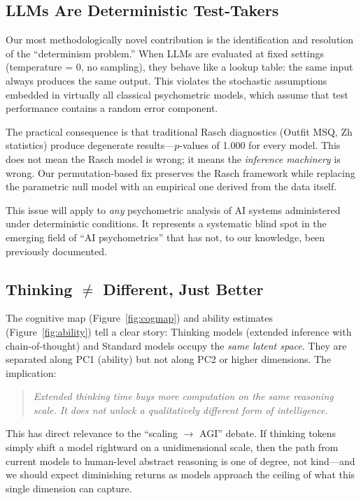 \documentclass[11pt, letterpaper]{article}
\begin{document}
\subsection{LLMs Are Deterministic Test-Takers}

Our most methodologically novel contribution is the identification and resolution of the ``determinism problem.'' When LLMs are evaluated at fixed settings (temperature = 0, no sampling), they behave like a lookup table: the same input always produces the same output. This violates the stochastic assumptions embedded in virtually all classical psychometric models, which assume that test performance contains a random error component.

The practical consequence is that traditional Rasch diagnostics (Outfit MSQ, Zh statistics) produce degenerate results---$p$-values of 1.000 for every model. This does not mean the Rasch model is wrong; it means the \textit{inference machinery} is wrong. Our permutation-based fix preserves the Rasch framework while replacing the parametric null model with an empirical one derived from the data itself.

This issue will apply to \textit{any} psychometric analysis of AI systems administered under deterministic conditions. It represents a systematic blind spot in the emerging field of ``AI psychometrics'' that has not, to our knowledge, been previously documented.

\subsection{Thinking $\neq$ Different, Just Better}

The cognitive map (Figure~\ref{fig:cogmap}) and ability estimates (Figure~\ref{fig:ability}) tell a clear story: Thinking models (extended inference with chain-of-thought) and Standard models occupy the \textit{same latent space}. They are separated along PC1 (ability) but not along PC2 or higher dimensions. The implication:

\begin{quote}
    \textit{Extended thinking time buys more computation on the same reasoning scale. It does not unlock a qualitatively different form of intelligence.}
\end{quote}

This has direct relevance to the ``scaling $\rightarrow$ AGI'' debate. If thinking tokens simply shift a model rightward on a unidimensional scale, then the path from current models to human-level abstract reasoning is one of degree, not kind---and we should expect diminishing returns as models approach the ceiling of what this single dimension can capture.
\end{document}
